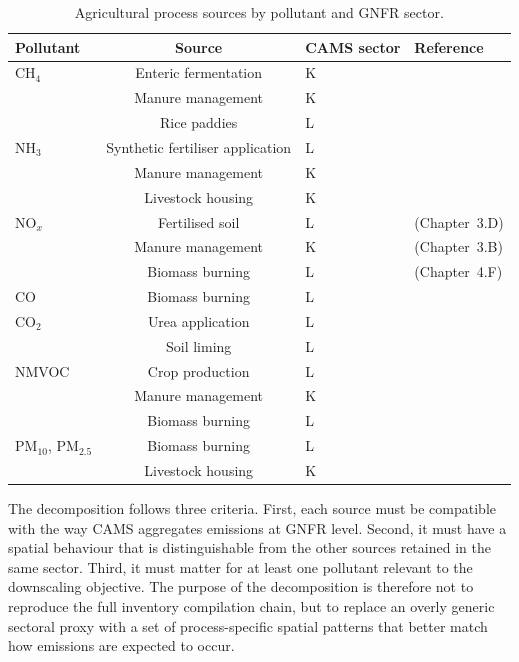 \begin{table}[htbp]
  \centering
  \caption{Agricultural process sources by pollutant and GNFR sector.}
  \label{tab:pollutant_sources}
  \begin{tabular}{lcll}
    \hline
    Pollutant & Source & CAMS sector & Reference \\
    \hline
    CH$_4$ & Enteric fermentation & K & \citep{ref_ch4_nh3_review} \\
     & Manure management & K & \citep{ref_ch4_nh3_review} \\
     & Rice paddies & L & \citep{ref_ch4_nh3_review} \\
    \hline
    NH$_3$ & Synthetic fertiliser application & L & \citep{EMEP_EEA} \\
     & Manure management & K & \citep{EMEP_EEA} \\
     & Livestock housing & K & \citep{EMEP_EEA} \\
    \hline
    NO$_x$ & Fertilised soil & L & \citep{EMEP_EEA} (Chapter~3.D) \\
     & Manure management & K & \citep{EMEP_EEA} (Chapter~3.B) \\
     & Biomass burning & L & \citep{EMEP_EEA} (Chapter~4.F) \\
    \hline
    CO & Biomass burning & L & \citep{andreae_merlet_2001} \\
    \hline
    CO$_2$ & Urea application & L & \citep{IPPC_2006_V10,kim2017} \\
     & Soil liming & L & \citep{IPPC_2006_V10,RB209} \\
    \hline
    NMVOC & Crop production & L & \citep{konig1995,lamb1993} \\
     & Manure management & K & \citep{schade_crutzen_1995,Puliafito_2019} \\
     & Biomass burning & L & \citep{Puliafito_2019} \\
    \hline
    PM$_{10}$, PM$_{2.5}$ & Biomass burning & L & \citep{Puliafito_2019,karanasiou_2021} \\
     & Livestock housing & K & \citep{cambra_lopez_2010} \\
    \hline
  \end{tabular}
\end{table}

The decomposition follows three criteria. First, each source must be
compatible with the way CAMS aggregates emissions at GNFR level.
Second, it must have a spatial behaviour that is distinguishable from
the other sources retained in the same sector. Third, it must matter
for at least one pollutant relevant to the downscaling objective. The
purpose of the decomposition is therefore not to reproduce the full
inventory compilation chain, but to replace an overly generic sectoral
proxy with a set of process-specific spatial patterns that better match
how emissions are expected to occur.

